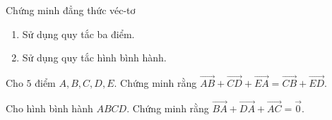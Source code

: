 
\begin{dang}{Chứng minh đẳng thức véc-tơ}
	\begin{enumerate}
		\item Sử dụng quy tắc ba điểm.
		\item Sử dụng quy tắc hình bình hành.
	\end{enumerate}
\end{dang}
\begin{vd}%
	Cho $5$ điểm $A, B, C, D, E$. Chứng minh rằng $\overrightarrow{AB}+\overrightarrow{CD}+\overrightarrow{EA}=\overrightarrow{CB}+\overrightarrow{ED}$.
\end{vd}

\begin{vd}%
	Cho hình bình hành $ABCD$. Chứng minh rằng $\overrightarrow{BA}+\overrightarrow{DA}+\overrightarrow{AC}=\overrightarrow{0}$.
\end{vd}

